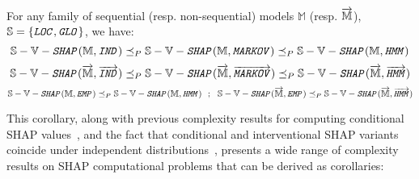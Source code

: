 \begin{corollary}
    For any family of sequential (resp. non-sequential) models $\mathbb{M}$ (resp. $\overrightarrow{\mathbb{M}}$), $\mathbb{S} = \{ \texttt{\emph{LOC}}, \texttt{\emph{GLO}} \}$, we have:
    \begin{equation}\label{app:eq:markov2hmm1}
        \mathbb{S}-\mathbb{V}-\texttt{\emph{SHAP}}(\mathbb{M}, \texttt{\emph{IND}}) \preceq_{P} \mathbb{S}-\mathbb{V}-\texttt{\emph{SHAP}}(\mathbb{M}, \texttt{\emph{MARKOV}}) \preceq_{P} \mathbb{S}-\mathbb{V}-\texttt{\emph{SHAP}}(\mathbb{M}, \texttt{\emph{HMM}})
    \end{equation}
    \begin{equation}\label{app:eq:markov2hmm2}
        \mathbb{S}-\mathbb{V}-\texttt{\emph{SHAP}}(\overrightarrow{\mathbb{M}},
    \overrightarrow{\texttt{\emph{IND}}}) \preceq_{P} \mathbb{S}-\mathbb{V}-\texttt{\emph{SHAP}}(\overrightarrow{\mathbb{M}}, \overrightarrow{\texttt{\emph{MARKOV}}}) \preceq_{P} \mathbb{S}-\mathbb{V}-\texttt{\emph{SHAP}}(\overrightarrow{\mathbb{M}}, \overrightarrow{\texttt{\emph{HMM}}})
    \end{equation}
    \begin{equation}\label{app:eq:markov2hmm1}
        \mathbb{S}-\mathbb{V}-\texttt{\emph{SHAP}}(\mathbb{M}, \texttt{\emph{EMP}}) \preceq_{P} \mathbb{S}-\mathbb{V}-\texttt{\emph{SHAP}}(\mathbb{M}, \texttt{\emph{HMM}}) \ \ ; \      \    \mathbb{S}-\mathbb{V}-\texttt{\emph{SHAP}}(\overrightarrow{\mathbb{M}}, \texttt{\emph{EMP}}) \preceq_{P} \mathbb{S}-\mathbb{V}-\texttt{\emph{SHAP}}(\overrightarrow{\mathbb{M}}, \overrightarrow{\texttt{\emph{HMM}}})
    \end{equation}
\end{corollary}

This corollary, along with previous complexity results for computing conditional SHAP values~\citep{vander21, huangupdates, arenas23}, and the fact that conditional and interventional SHAP variants coincide under independent distributions~\citep{sundararajan20b}, presents a wide range of complexity results on SHAP computational problems that can be derived as corollaries:

